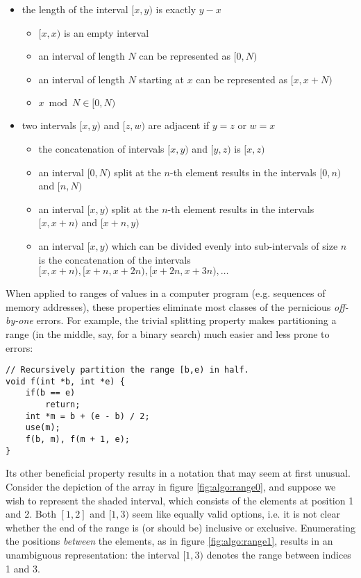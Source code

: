 \begin{itemize}
    \item the length of the interval $[x,y)$ is exactly $y - x$
        \begin{itemize}
            \item $[x,x)$ is an empty interval
            \item an interval of length $N$ can be represented as $[0,N)$
            \item
                an interval of length $N$ starting at $x$ can be represented
                as $[x,x+N)$
            \item $x \bmod N \in [0,N)$
        \end{itemize}
    \item two intervals $[x,y)$ and $[z,w)$ are adjacent if $y = z$ or $w = x$
        \begin{itemize}
            \item the concatenation of intervals $[x,y)$ and $[y,z)$ is $[x,z)$
            \item
                an interval $[0,N)$ split at the $n$-th element results in the
                intervals $[0,n)$ and $[n,N)$
            \item
                an interval $[x,y)$ split at the $n$-th element results in the
                intervals $[x,x+n)$ and $[x+n,y)$
            \item
                an interval $[x,y)$ which can be divided evenly into
                sub-intervals of size $n$ is the concatenation of the intervals
                $[x, x + n), [x + n, x + 2n), [x + 2n, x + 3n), \ldots$
        \end{itemize}
\end{itemize}

When applied to ranges of values in a computer program (e.g. sequences of memory
addresses), these properties eliminate most classes of the pernicious
\textit{off-by-one} errors.  For example, the trivial splitting property makes
partitioning a range (in the middle, say, for a binary search) much easier and
less prone to errors:

\begin{lstlisting}[style=c]
// Recursively partition the range [b,e) in half.
void f(int *b, int *e) {
    if(b == e)
        return;
    int *m = b + (e - b) / 2;
    use(m);
    f(b, m), f(m + 1, e);
}
\end{lstlisting}

Its other beneficial property results in a notation that may seem at first
unusual.  Consider the depiction of the array in figure \ref{fig:algo:range0},
and suppose we wish to represent the shaded interval, which consists of the
elements at position 1 and 2.  Both $[1,2]$ and $[1,3)$ seem like equally valid
options, i.e. it is not clear whether the end of the range is (or should be)
inclusive or exclusive.  Enumerating the positions \emph{between} the elements,
as in figure \ref{fig:algo:range1}, results in an unambiguous representation:
the interval $[1,3)$ denotes the range between indices 1 and 3.

